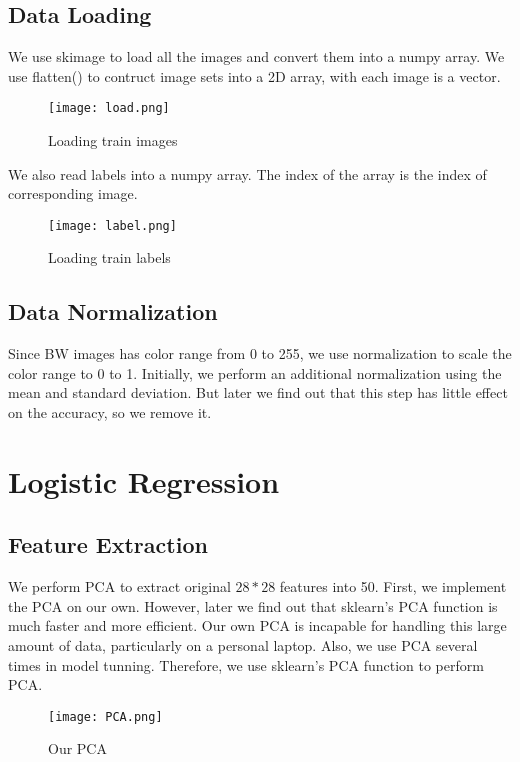 \documentclass[conference]{IEEEtran}
\begin{document}
\subsection{Data Loading}
We use skimage to load all the images and convert them into a numpy array. We use flatten() to contruct image sets into a 2D array, with each image is a vector.\\
    \begin{figure}[ht]
    \centering
    \texttt{[image: load.png]}
    \caption{Loading train images}
    \label{fig1:Loading train images}
    \end{figure}
We also read labels into a numpy array. The index of the array is the index of corresponding image.
    \begin{figure}[ht]
    \centering
    \texttt{[image: label.png]}
    \caption{Loading train labels}
    \label{fig2:Loading train labels}
    \end{figure}
\subsection{Data Normalization}
Since BW images has color range from 0 to 255, we use normalization to scale the color range to 0 to 1.
Initially, we perform an additional normalization using the mean and standard deviation. But later we find out
that this step has little effect on the accuracy, so we remove it.




\section{Logistic Regression}
\subsection{Feature Extraction}
We perform PCA to extract original $28*28$ features into 50. First, we implement the PCA on our own.
However, later we find out that sklearn's PCA function is much faster and more efficient. Our own PCA is incapable for
handling this large amount of data, particularly on a personal laptop. Also, we use PCA several times in model tunning. 
Therefore, we use sklearn's PCA function to perform PCA.
\begin{figure}[ht]
    \centering
    \texttt{[image: PCA.png]}
    \caption{Our PCA}
    \label{fig3:Our PCA}
    \end{figure}
\end{document}
